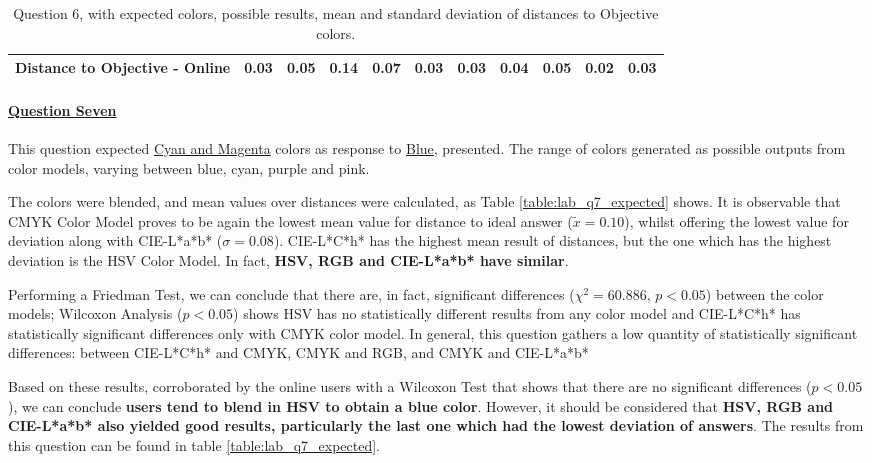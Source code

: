 \begin{table}[H]
{\begin{tabular}{lccccccccccccc}
    \multicolumn{4}{l}{Distance to Objective - Online}                                                                                               & \multicolumn{1}{|c}{0.03}        & \multicolumn{1}{c|}{0.05}    & \multicolumn{1}{|c}{0.14}        & \multicolumn{1}{c|}{0.07}    & \multicolumn{1}{|c}{0.03}       & \multicolumn{1}{c|}{0.03}    & \multicolumn{1}{|c}{0.04}        & \multicolumn{1}{c|}{0.05}    & \multicolumn{1}{|c}{\textbf{0.02}}       & \multicolumn{1}{c|}{0.03}    \\ \hline
    \end{tabular}}
  \caption[Question 6, with expected Results.]{Question 6, with expected colors, possible results, mean and standard deviation of distances to Objective colors.}
  \label{table:lab_q6_expected}
\end{table}
%
\paragraph{\ul{Question Seven}}
%
This question expected \ul{Cyan and Magenta} colors as response to \ul{Blue}, presented. The range of colors generated as possible outputs from color models, varying between blue,
cyan, purple and pink. \par
%
The colors were blended, and mean values over distances were calculated, as Table \ref{table:lab_q7_expected} shows. It is observable that CMYK Color Model proves to be again the
lowest mean value for distance to ideal answer ($\tilde{x} = 0.10$), whilst offering the lowest value for deviation along with CIE-L*a*b* ($\sigma = 0.08$). CIE-L*C*h* has the
highest mean result of distances, but the one which has the highest deviation is the HSV Color Model. In fact, \textbf{HSV, RGB and CIE-L*a*b* have similar}. \par
%
Performing a Friedman Test, we can conclude that there are, in fact, significant differences ($\chi^2 = 60.886$, $p < 0.05$) between the color models; Wilcoxon Analysis ($p < 0.05$)
shows HSV has no statistically different results from any color model and CIE-L*C*h* has statistically significant differences only with CMYK color model. In general, this question
gathers a low quantity of statistically significant differences: between CIE-L*C*h* and CMYK, CMYK and RGB, and CMYK and CIE-L*a*b* \par
%
Based on these results, corroborated by the online users with a Wilcoxon Test that shows that there are no significant differences ($p < 0.05$), we can conclude \textbf{users tend
to blend in HSV to obtain a blue color}. However, it should be considered that \textbf{HSV, RGB and CIE-L*a*b* also yielded good results, particularly the last one which had the
lowest deviation of answers}. The results from this question can be found in table \ref{table:lab_q7_expected}.
